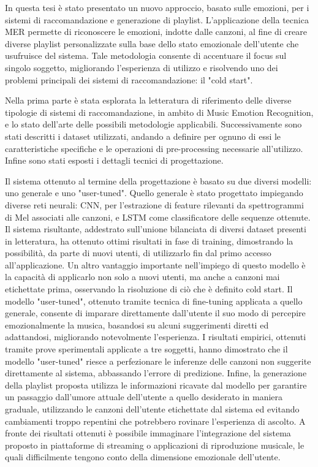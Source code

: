 \documentclass[11pt]{report}
\begin{document}
In questa tesi è stato presentato un nuovo approccio, basato sulle emozioni, per i sistemi di raccomandazione e generazione di playlist. L'applicazione della tecnica MER permette di riconoscere le emozioni, indotte dalle canzoni, al fine di creare diverse playlist personalizzate sulla base dello stato emozionale dell'utente che usufruisce del sistema. Tale metodologia consente di accentuare il focus sul singolo soggetto, migliorando l'esperienza di utilizzo e risolvendo uno dei problemi principali dei sistemi di raccomandazione: il "cold start". 

Nella prima parte è stata esplorata la letteratura di riferimento delle diverse tipologie di sistemi di raccomandazione, in ambito di Music Emotion Recognition, e lo stato dell'arte delle possibili metodologie applicabili. Successivamente sono stati descritti i dataset utilizzati, andando a definire per ognuno di essi le caratteristiche specifiche e le operazioni di pre-processing necessarie all'utilizzo. Infine sono stati esposti i dettagli tecnici di progettazione. 


Il sistema ottenuto al termine della progettazione è basato su due diversi modelli: uno generale e uno "user-tuned". Quello generale è stato progettato impiegando diverse reti neurali: CNN, per l'estrazione di feature rilevanti da spettrogrammi di Mel associati alle canzoni, e LSTM come classificatore delle sequenze ottenute. Il sistema risultante, addestrato sull'unione bilanciata di diversi dataset presenti in letteratura, ha ottenuto ottimi risultati in fase di training, dimostrando la possibilità, da parte di nuovi utenti, di utilizzarlo fin dal primo accesso all'applicazione. Un altro vantaggio importante nell'impiego di questo modello è la capacità di applicarlo non solo a nuovi utenti, ma anche a canzoni mai etichettate prima, osservando la risoluzione di ciò che è definito cold start. Il modello "user-tuned", ottenuto tramite tecnica di fine-tuning applicata a quello generale,  consente di imparare direttamente dall'utente il suo modo di percepire emozionalmente la musica, basandosi su alcuni suggerimenti diretti ed adattandosi, migliorando notevolmente l'esperienza. I risultati empirici, ottenuti tramite prove sperimentali applicate a tre soggetti, hanno dimostrato che il modello "user-tuned" riesce a perfezionare le inferenze delle canzoni non suggerite direttamente al sistema, abbassando l'errore di predizione. Infine, la generazione della playlist proposta utilizza le informazioni ricavate dal modello per garantire un passaggio dall'umore attuale dell'utente a quello desiderato in maniera graduale, utilizzando le canzoni dell'utente etichettate dal sistema ed evitando cambiamenti troppo repentini che potrebbero rovinare l'esperienza di ascolto. A fronte dei risultati ottenuti è possibile immaginare l'integrazione del sistema proposto in piattaforme di streaming o applicazioni di riproduzione musicale, le quali difficilmente tengono conto della dimensione emozionale dell'utente.
\end{document}
